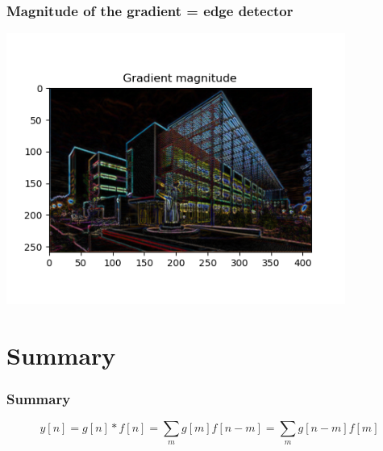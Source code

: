 \documentclass{beamer}
\begin{document}
\begin{frame}
  \frametitle{Magnitude of the gradient = edge detector}
      
  \centerline{\includegraphics[height=3.5in]{mp1fig9.png}}
\end{frame}

\section[Summary]{Summary}
\setcounter{subsection}{1}
\begin{frame}
  \frametitle{Summary}

    \[
    y[n] = g[n]\ast f[n] = \sum_m g[m] f[n-m] = \sum_m g[n-m] f[m]
    \]
\end{frame}
\end{document}
